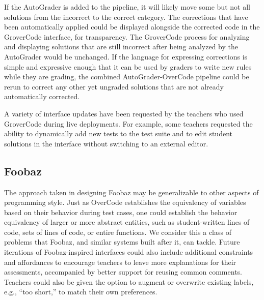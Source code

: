 If the AutoGrader is added to the pipeline, it will likely move some but not all solutions from the incorrect to the correct category. The corrections that have been automatically applied could be displayed alongside the corrected code in the GroverCode interface, for transparency. The GroverCode process for analyzing and displaying solutions that are still incorrect after being analyzed by the AutoGrader would be unchanged. If the language for expressing corrections is simple and expressive enough that it can be used by graders to write new rules while they are grading, the combined AutoGrader-OverCode pipeline could be rerun to correct any other yet ungraded solutions that are not already automatically corrected. 

A variety of interface updates have been requested by the teachers who used GroverCode during live deployments. For example, some teachers requested the ability to dynamically add new tests to the test suite and to edit student solutions in the interface without switching to an external editor. %

\subsection{Foobaz}

The approach taken in designing Foobaz may be generalizable to other aspects of programming style. Just as OverCode establishes the equivalency of variables based on their behavior during test cases, one could establish the behavior equivalency of larger or more abstract entities, such as student-written lines of code, sets of lines of code, or entire functions. We consider this a class of problems that Foobaz, and similar systems built after it, can tackle. Future iterations of Foobaz-inspired interfaces could also include additional constraints and affordances to encourage teachers to leave more explanations for their assessments, accompanied by better support for reusing common comments. Teachers could also be given the option to augment or overwrite existing labels, e.g., ``too short,'' to match their own preferences. %

